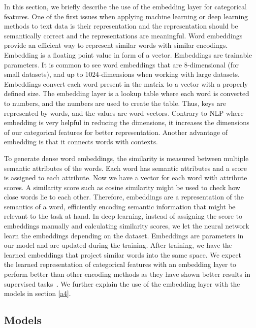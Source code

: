 \documentclass{article}
\begin{document}
In this section, we briefly describe the use of the embedding layer for categorical features. One of the first issues when applying machine learning or deep learning methods to text data is their representation and the representation should be semantically correct and the representations are meaningful. Word embeddings provide an efficient way to represent similar words with similar encodings. Embedding is a floating point value in form of a vector. Embeddings are trainable parameters. It is common to see word embeddings that are 8-dimensional (for small datasets), and up to 1024-dimensions when working with large datasets. Embeddings convert each word present in the matrix to a vector with a properly defined size. The embedding layer is a lookup table where each word is converted to numbers, and the numbers are used to create the table. Thus, keys are represented by words, and the values are word vectors. Contrary to NLP where embedding is very helpful in reducing the dimensions, it increases the dimensions of our categorical features for better representation. Another advantage of embedding is that it connects words with contexts. 

To generate dense word embeddings, the similarity is measured between multiple semantic attributes of the words. Each word has semantic attributes and a score is assigned to each attribute. Now we have a vector for each word with attribute scores. A similarity score such as cosine similarity might be used to check how close words lie to each other. Therefore, embeddings are a representation of the semantics of a word, efficiently encoding semantic information that might be relevant to the task at hand. In deep learning, instead of assigning the score to embeddings manually and calculating similarity scores, we let the neural network learn the embeddings depending on the dataset. Embeddings are parameters in our model and are updated during the training. After training, we have the learned embeddings that project similar words into the same space. We expect the learned representation of categorical features with an embedding layer to perform better than other encoding methods as they have shown better results in supervised tasks~\citep{entity1}. We further explain the use of the embedding layer with the models in section \ref{a4}.

\subsection{Models}\label{a3}
\end{document}
